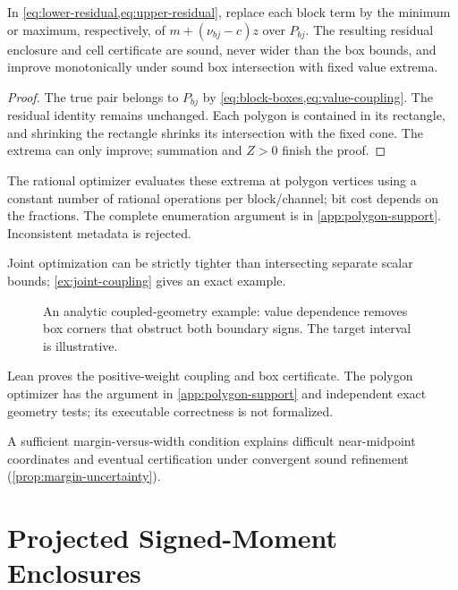 \begin{theorem}\label{thm:coupled-certificate}
In \cref{eq:lower-residual,eq:upper-residual}, replace each block term by the
minimum or maximum, respectively, of $m+(\nu_{bj}-c)z$ over $P_{bj}$.
The resulting residual enclosure and cell certificate are sound, never wider
than the box bounds, and improve monotonically under sound box intersection
with fixed value extrema.
\end{theorem}
\begin{proof}
The true pair belongs to $P_{bj}$ by \cref{eq:block-boxes,eq:value-coupling}.
The residual identity remains unchanged. Each polygon is contained in its
rectangle, and shrinking the rectangle shrinks its intersection with the
fixed cone. The extrema can only improve; summation and $Z>0$ finish the proof.
\end{proof}

The rational optimizer evaluates these extrema at polygon vertices using a
constant number of rational operations per block/channel; bit cost depends
on the fractions. The complete enumeration argument is in
\cref{app:polygon-support}. Inconsistent metadata is rejected.

Joint optimization can be strictly tighter than intersecting separate scalar
bounds; \cref{ex:joint-coupling} gives an exact example.

\begin{figure}[!t]
 \centering
 
 \caption{An analytic coupled-geometry example: value dependence removes box
 corners that obstruct both boundary signs. The target interval is illustrative.}
 \label{fig:coupled-geometry}
\end{figure}

Lean proves the positive-weight coupling and box certificate. The polygon
optimizer has the argument in \cref{app:polygon-support} and independent exact geometry tests; its
executable correctness is not formalized.

A sufficient margin-versus-width condition explains difficult near-midpoint
coordinates and eventual certification under convergent sound refinement
(\cref{prop:margin-uncertainty}).

\section{Projected Signed-Moment Enclosures}
\label{sec:moments}

